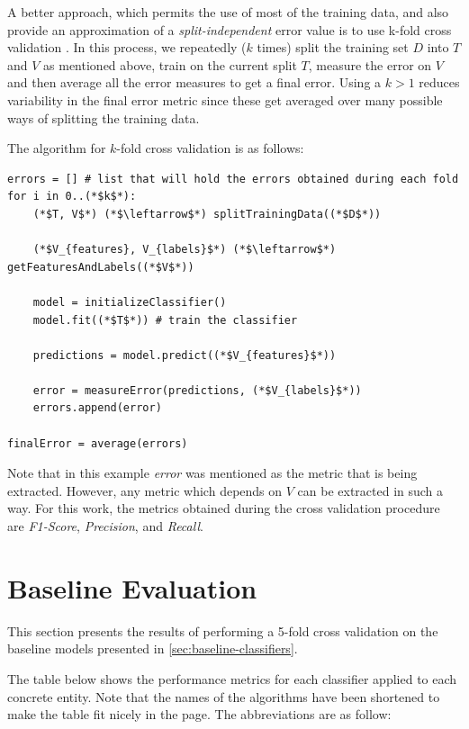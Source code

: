 \documentclass[epsfig,a4paper,11pt,titlepage,twoside,openany]{book}
\begin{document}
A better approach, which permits the use of most of the training data, and also provide an approximation of a \textit{split-independent} error value is to use k-fold cross validation \cite{Kohavi:1995_study_of_cross_validation,Cawley:2010_crossval_model_selection}. In this process, we repeatedly ($k$ times) split the training set $D$ into $T$ and $V$ as mentioned above, train on the current split $T$, measure the error on $V$ and then average all the error measures to get a final error. Using a $k > 1$ reduces variability in the final error metric since these get averaged over many possible ways of splitting the training data.

The algorithm for $k$-fold cross validation is as follows:

\begin{lstlisting}
errors = [] # list that will hold the errors obtained during each fold
for i in 0..(*$k$*):
    (*$T, V$*) (*$\leftarrow$*) splitTrainingData((*$D$*))
    
    (*$V_{features}, V_{labels}$*) (*$\leftarrow$*) getFeaturesAndLabels((*$V$*))
    
    model = initializeClassifier()
    model.fit((*$T$*)) # train the classifier
    
    predictions = model.predict((*$V_{features}$*))
    
    error = measureError(predictions, (*$V_{labels}$*))
    errors.append(error)
    
finalError = average(errors)
\end{lstlisting}

Note that in this example \textit{error} was mentioned as the metric that is being extracted. However, any metric which depends on $V$ can be extracted in such a way. For this work, the metrics obtained during the cross validation procedure are \textit{F1-Score}, \textit{Precision}, and \textit{Recall}.


\section{Baseline Evaluation}
\label{sec:baseline-evaluation}

This section presents the results of performing a 5-fold cross validation on the baseline models presented in \autoref{sec:baseline-classifiers}. 

The table below shows the performance metrics for each classifier applied to each concrete entity. Note that the names of the algorithms have been shortened to make the table fit nicely in the page. The abbreviations are as follow:
\end{document}
